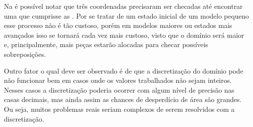 Na  é possível notar que três coordenadas precisaram ser checadas
até encontrar uma que cumprisse as .
Por se tratar de um estado inicial de um modelo pequeno esse processo não é tão custoso, porém em
modelos maiores ou estados mais avançados isso se tornará cada vez mais custoso, visto que o domínio
será maior e, principalmente, mais peças estarão alocadas para checar possíveis sobreposições.



Outro fator o qual deve ser observado é de que a discretização do domínio pode não funcionar bem em
casos onde os valores trabalhados não sejam inteiros.
Nesses casos a discretização poderia ocorrer com algum nível de precisão nas casas decimais,
mas ainda assim as chances de desperdício de área são grandes.
Ou seja, muitos problemas reais seriam complexos de serem resolvidos com a discretização.
